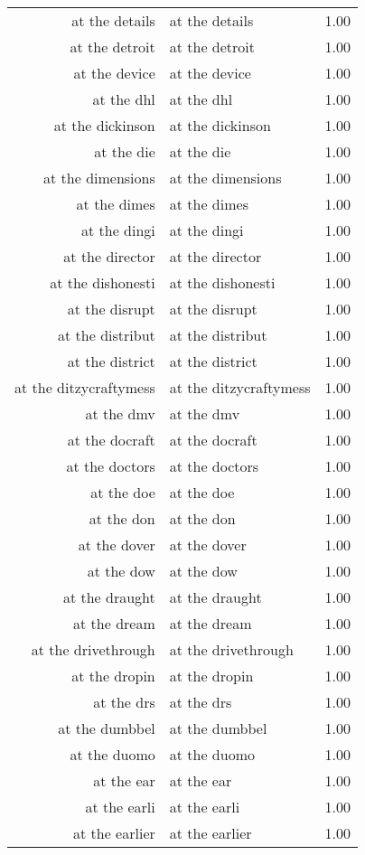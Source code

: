 \begin{table}[ht]
\begin{tabular}{rlr}
  at the details & at the details & 1.00 \\ 
  at the detroit & at the detroit & 1.00 \\ 
  at the device & at the device & 1.00 \\ 
  at the dhl & at the dhl & 1.00 \\ 
  at the dickinson & at the dickinson & 1.00 \\ 
  at the die & at the die & 1.00 \\ 
  at the dimensions & at the dimensions & 1.00 \\ 
  at the dimes & at the dimes & 1.00 \\ 
  at the dingi & at the dingi & 1.00 \\ 
  at the director & at the director & 1.00 \\ 
  at the dishonesti & at the dishonesti & 1.00 \\ 
  at the disrupt & at the disrupt & 1.00 \\ 
  at the distribut & at the distribut & 1.00 \\ 
  at the district & at the district & 1.00 \\ 
  at the ditzycraftymess & at the ditzycraftymess & 1.00 \\ 
  at the dmv & at the dmv & 1.00 \\ 
  at the docraft & at the docraft & 1.00 \\ 
  at the doctors & at the doctors & 1.00 \\ 
  at the doe & at the doe & 1.00 \\ 
  at the don & at the don & 1.00 \\ 
  at the dover & at the dover & 1.00 \\ 
  at the dow & at the dow & 1.00 \\ 
  at the draught & at the draught & 1.00 \\ 
  at the dream & at the dream & 1.00 \\ 
  at the drivethrough & at the drivethrough & 1.00 \\ 
  at the dropin & at the dropin & 1.00 \\ 
  at the drs & at the drs & 1.00 \\ 
  at the dumbbel & at the dumbbel & 1.00 \\ 
  at the duomo & at the duomo & 1.00 \\ 
  at the ear & at the ear & 1.00 \\ 
  at the earli & at the earli & 1.00 \\ 
  at the earlier & at the earlier & 1.00 \\ 

\end{tabular}
\end{table}
